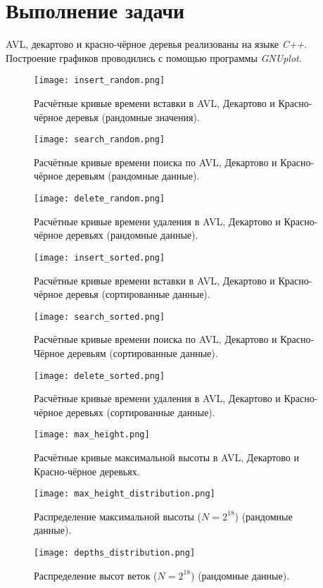 \documentclass[12pt, a4paper]{report}
\begin{document}
	\newpage

	\section*{Выполнение задачи}
	AVL, декартово и красно-чёрное деревья реализованы на языке \textit{C++}. Построение графиков проводились с помощью программы \textit{GNUplot}.

	\newpage
	\vfill

	\begin{figure}[h]
		\centering
		\texttt{[image: insert\_random.png]}
		\caption{Расчётные кривые времени вставки в AVL, Декартово и Красно-чёрное деревья (рандомные значения).}
	\end{figure}
	\begin{figure}[h]
		\centering
		\texttt{[image: search\_random.png]}
		\caption{Расчётные кривые времени поиска по AVL, Декартово и Красно-чёрное деревьям (рандомные данные).}
	\end{figure}
	\begin{figure}[h]
		\centering
		\texttt{[image: delete\_random.png]}
		\caption{Расчётные кривые времени удаления в AVL, Декартово и Красно-чёрное деревьях (рандомные данные).}
	\end{figure}
	\begin{figure}[h]
		\centering
		\texttt{[image: insert\_sorted.png]}
		\caption{Расчётные кривые времени вставки в AVL, Декартово и Красно-чёрное деревья (сортированные данные).}
	\end{figure}
	\begin{figure}[h]
		\centering
		\texttt{[image: search\_sorted.png]}
		\caption{Расчётные кривые времени поиска по AVL, Декартово и Красно-Чёрное деревьям (сортированные данные).}
	\end{figure}
	\begin{figure}[h]
		\centering
		\texttt{[image: delete\_sorted.png]}
		\caption{Расчётные кривые времени удаления в AVL, Декартово и Красно-чёрное деревьях (сортированные данные).}
	\end{figure}	
	\begin{figure}[h]
		\centering
		\texttt{[image: max\_height.png]}
		\caption{Расчётные кривые максимальной высоты в AVL, Декартово и Красно-чёрное деревьях.}
	\end{figure}
	\begin{figure}[h]
		\centering
		\texttt{[image: max\_height\_distribution.png]}
		\caption{Распределение максимальной высоты ($N = 2^{18}$) (рандомные данные).}
	\end{figure}	
	\begin{figure}[h]
		\centering
		\texttt{[image: depths\_distribution.png]}
		\caption{Распределение высот веток ($N = 2^{18}$) (рандомные данные).}
	\end{figure}
\end{document}
